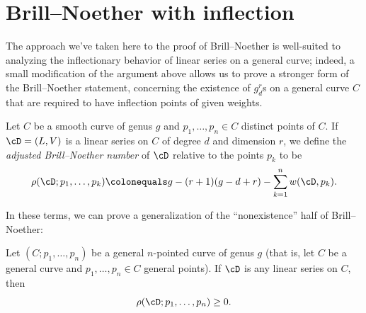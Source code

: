 \section{Brill--Noether with inflection}

The approach we've taken here to the proof of Brill--Noether is
%
%
%
well-suited to analyzing the inflectionary behavior of linear series on a
general curve; indeed, a small modification of the argument above allows
us to prove a stronger form of the Brill--Noether statement, concerning
the existence of $g^r_d$s on a general curve $C$ that are required to
 have inflection points of given weights.

\begin{definition}
Let $C$ be a smooth curve of genus $g$ and $p_1,\dots,p_n \in C$ distinct
points of $C$. If $\cD = (L,V)$ is a linear series on $C$ of degree $d$
and dimension $r$, we define the \emph{adjusted Brill--Noether number}
%
of $\cD$ relative to the points $p_k$ to be
$$
\rho(\cD; p_1,\dots,p_k) \colonequals  g - (r+1)(g-d+r) - \sum_{k=1}^n
w(\cD,p_k).
$$
\end{definition}

In these terms, we can prove
a
generalization of the
``nonexistence'' half of Brill--Noether:

\begin{theorem}\label{Brill--Noether with inflection}
Let $(C;p_1,\dots,p_n)$ be a general $n$-pointed curve of genus $g$
(that is, let $C$ be a general curve and $p_1,\dots,p_n \in C$ general
points). If $\cD$ is any linear series on $C$, then
$$
\rho(\cD; p_1,\dots,p_n) \geq 0.
$$
\end{theorem}

